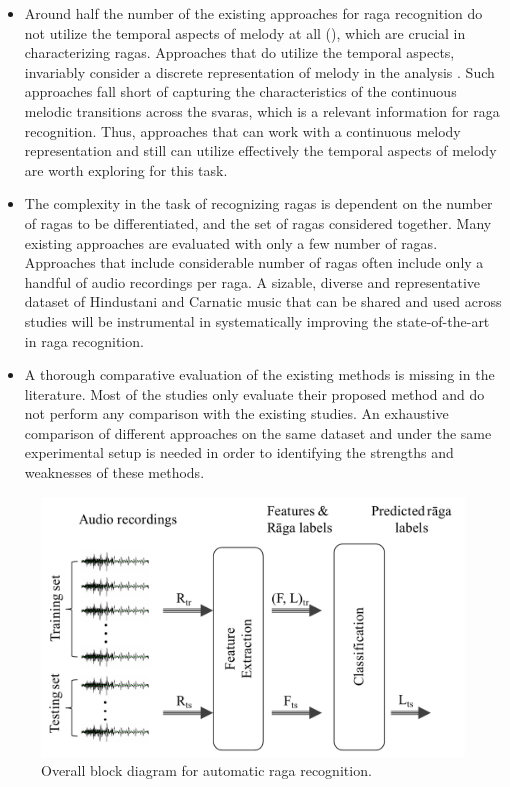 \begin{itemize}
	\item Around half the number of the existing approaches for \gls{raga} recognition do not utilize the temporal aspects of melody at all (), which are crucial in characterizing \glspl{raga}. Approaches that do utilize the temporal aspects, invariably consider a discrete representation of melody in the analysis . Such approaches fall short of capturing the characteristics of the continuous melodic transitions across the \glspl{svara}, which is a relevant information for \gls{raga} recognition. Thus, approaches that can work with a continuous melody representation and still can utilize effectively the temporal aspects of melody are worth exploring for this task.
	
	\item The complexity in the task of recognizing \glspl{raga} is dependent on the number of \glspl{raga} to be differentiated, and the set of \glspl{raga} considered together. Many existing approaches are evaluated with only a few number of \glspl{raga}. Approaches that include considerable number of \glspl{raga} often include only a handful of audio recordings per \gls{raga}. A sizable, diverse and representative dataset of Hindustani and Carnatic music that can be shared and used across studies will be instrumental in systematically improving the state-of-the-art in \gls{raga} recognition.
	
	\item A thorough comparative  evaluation of the existing methods is missing in the literature. Most of the studies only evaluate their proposed method and do not perform any comparison with the existing studies. An exhaustive comparison of different approaches on the same dataset and under the same experimental setup is needed in order to identifying the strengths and weaknesses of these methods.
	
\end{itemize}

\begin{figure}
	\begin{center}
		\includegraphics[width=\figSizeEightyFive]{ch07_ragaRecognition/figures/bd_overall_raga_recognition.pdf}
	\end{center}
	\caption{Overall block diagram for automatic \gls{raga} recognition.}
	\label{fig:bd_raga_recognition}
\end{figure}

